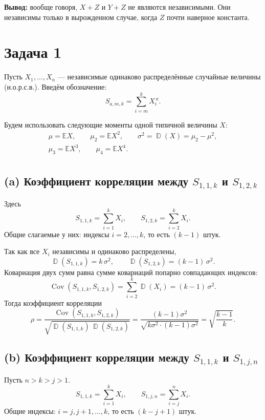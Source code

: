 \documentclass[12pt]{article}
\DeclareMathOperator{\Var}{\mathbb{D}}
\DeclareMathOperator{\Cov}{Cov}
\newcommand{\E}{\mathbb{E}}
\begin{document}
    \medskip
    \noindent
    \textbf{Вывод:} вообще говоря, $X+Z$ и $Y+Z$ не являются независимыми. Они независимы только в вырожденном случае, когда $Z$ почти наверное константа.


    \section*{Задача 1}

    Пусть $X_1,\dots,X_n$ --- независимые одинаково распределённые случайные величины (н.о.р.с.в.). Введём обозначение:
    \[
        S_{a,m,k} = \sum_{i=m}^{k} X_i^{\,a}.
    \]

    Будем использовать следующие моменты одной типичной величины $X$:
    \begin{gather*}
        \mu = \E X,\qquad
        \mu_2 = \E X^2,\qquad
        \sigma^2 = \Var(X) = \mu_2 - \mu^2,\\
        \mu_3 = \E X^3,\qquad
        \mu_4 = \E X^4.\\
    \end{gather*}

    \subsection*{(a) Коэффициент корреляции между $S_{1,1,k}$ и $S_{1,2,k}$}

    Здесь
    \[
        S_{1,1,k} = \sum_{i=1}^k X_i,\qquad
        S_{1,2,k} = \sum_{i=2}^k X_i.
    \]
    Общие слагаемые у них: индексы $i=2,\dots,k$, то есть $(k-1)$ штук.

    Так как все $X_i$ независимы и одинаково распределены,
    \[
        \Var(S_{1,1,k}) = k\,\sigma^2,\qquad
        \Var(S_{1,2,k}) = (k-1)\,\sigma^2.
    \]
    Ковариация двух сумм равна сумме ковариаций попарно совпадающих индексов:
    \[
        \Cov(S_{1,1,k}, S_{1,2,k})
        = \sum_{i=2}^{k} \Var(X_i)
        = (k-1)\,\sigma^2.
    \]
    Тогда коэффициент корреляции
    \[
        \rho
        = \frac{\Cov(S_{1,1,k}, S_{1,2,k})}{\sqrt{\Var(S_{1,1,k})\,\Var(S_{1,2,k})}}
        = \frac{(k-1)\sigma^2}{\sqrt{k\sigma^2 \cdot (k-1)\sigma^2}}
        = \sqrt{\frac{k-1}{k}}.
    \]

    \subsection*{(b) Коэффициент корреляции между $S_{1,1,k}$ и $S_{1,j,n}$}

    Пусть $n>k>j>1$.
    \[
        S_{1,1,k} = \sum_{i=1}^k X_i,\qquad
        S_{1,j,n} = \sum_{i=j}^n X_i.
    \]
    Общие индексы: $i=j,j+1,\dots,k$, то есть $(k-j+1)$ штук.
\end{document}
